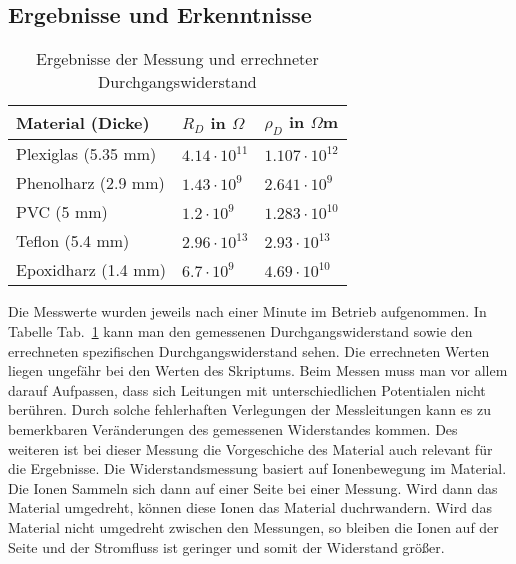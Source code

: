 \documentclass[a4paper,twoside,12pt,DIV=13,BCOR=5mm,numbers=noenddot,cleardoublepage=empty]{scrbook}
\begin{document}
            \subsection{Ergebnisse und Erkenntnisse}
            \begin{table}[h]
                \begin{center}
                    \begin{tabular}{|l||l|l|}
                        \hline
                        Material (Dicke) & $R_D$ in $\Omega$ & $\rho_D$ in $\Omega$m \\
                        \hline
                        \hline
                        Plexiglas (5.35 mm) & $4.14 \cdot 10^{11}$ & $1.107 \cdot 10^{12}$ \\
                        \hline
                        Phenolharz (2.9 mm) & $1.43 \cdot 10^{9}$ & $2.641 \cdot 10^{9}$ \\
                        \hline
                        PVC (5 mm) & $1.2 \cdot 10^{9}$ & $1.283 \cdot 10^{10}$ \\
                        \hline
                        Teflon (5.4 mm) & $2.96 \cdot 10^{13}$ & $2.93 \cdot 10^{13}$ \\
                        \hline
                        Epoxidharz (1.4 mm) & $6.7 \cdot 10^{9}$ & $4.69 \cdot 10^{10}$ \\
                        \hline
                    \end{tabular}
                    \caption{Ergebnisse der Messung und errechneter Durchgangswiderstand}
                    \label{tab:table1}
                \end{center}
            \end{table}
            Die Messwerte wurden jeweils nach einer Minute im Betrieb aufgenommen. In Tabelle
            Tab.~\ref{tab:table1} kann man den gemessenen Durchgangswiderstand sowie den errechneten spezifischen
            Durchgangswiderstand sehen. Die errechneten Werten liegen ungef\"ahr bei den Werten des Skriptums.
            Beim Messen muss man vor allem darauf Aufpassen, dass sich Leitungen mit 
            unterschiedlichen Potentialen nicht ber\"uhren. Durch solche fehlerhaften Verlegungen
            der Messleitungen kann es zu bemerkbaren Ver\"anderungen des gemessenen Widerstandes
            kommen. Des weiteren ist bei dieser Messung die Vorgeschiche des Material auch relevant f\"ur die
            Ergebnisse. Die Widerstandsmessung basiert auf Ionenbewegung im Material. Die Ionen Sammeln sich
            dann auf einer Seite bei einer Messung. Wird dann das Material umgedreht, k\"onnen diese Ionen das 
            Material duchrwandern. Wird das Material nicht umgedreht zwischen den Messungen, so bleiben die Ionen
            auf der Seite und der Stromfluss ist geringer und somit der Widerstand gr\"o\ss{}er.
\end{document}
